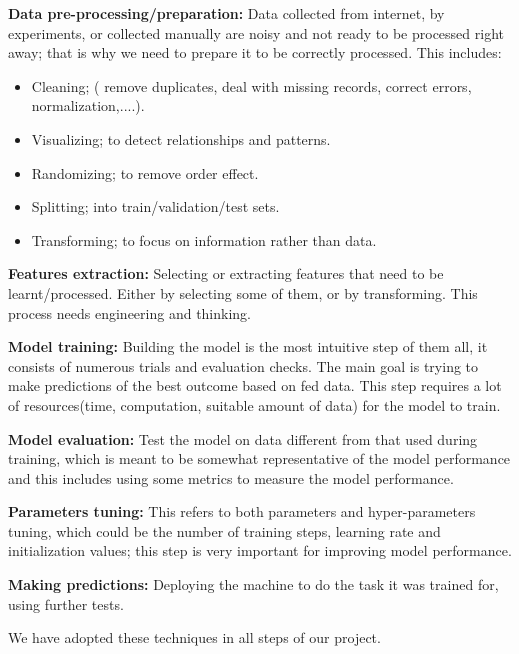 \textbf{Data pre-processing/preparation: }Data collected from internet, by experiments, or collected manually are noisy and not ready to be processed right away; that is why we need to prepare it to be correctly processed. This includes:
\begin{itemize}
  \item Cleaning; ( remove duplicates, deal with missing records, correct errors, normalization,....).
  \item Visualizing; to detect relationships and patterns.
  \item Randomizing; to remove order effect.
  \item Splitting; into train/validation/test sets.
  \item Transforming; to focus on information rather than data. \newline
\end{itemize} 

\textbf{Features extraction: }Selecting or extracting features that need to be learnt/processed. Either by selecting some of them, or by transforming. This process needs engineering and thinking.\newline

\textbf{Model training: }Building the model is the most intuitive step of them all, it consists of numerous trials and evaluation checks. The main goal is trying to make predictions of the best outcome based on fed data. This step requires a lot of resources(time, computation, suitable amount of data) for the model to train.\newline

\textbf{Model evaluation: }Test the model on data different from that used during training, which is meant to be somewhat representative of the model performance and this includes using some metrics to measure the model performance.\newline

\textbf{Parameters tuning: }This refers to both parameters and hyper-parameters tuning, which could be the number of training steps, learning rate and initialization values; this step is very important for improving model performance.\newline

\textbf{Making predictions: }Deploying the machine to do the task it was trained for, using further tests.\newline

We have adopted these techniques in all steps of our project.

